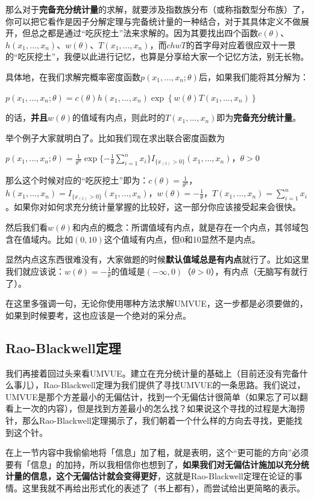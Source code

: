 \documentclass[10pt, a4paper]{article}
\begin{document}
那么对于\textbf{完备充分统计量}的求解，就要涉及指数族分布（或称指数型分布族）了，你可以把它看作是因子分解定理与完备统计量的一种结合，对于其具体定义不做展开，但总之都是通过“吃灰挖土”法来求解的。因为其要找出四个函数$c(\theta)$、$h(x_1,\dots,x_n)$、$w(\theta)$、$T(x_1,\dots,x_n)$，而$chwT$的首字母对应着很应双十一景的“吃灰挖土”，我便以此进行记忆，也算是分享给大家一个记忆方法，别无长物。\par
具体地，在我们求解完概率密度函数$p(x_1,\dots,x_n;\theta)$后，如果我们能将其分解为：
\begin{center}
   $p(x_1,\dots,x_n;\theta)=c(\theta)h(x_1,\dots,x_n)\exp\left\{w(\theta)T(x_1,\dots,x_n)\right\}$ 
\end{center}
的话，\textbf{并且}$w(\theta)$的值域有内点，则此时的$T(x_1,\dots,x_n)$即为\textbf{完备充分统计量}。\par
举个例子大家就明白了。比如我们现在求出联合密度函数为
\begin{center}
    $p(x_1,\dots,x_n;\theta)=\frac{1}{\theta ^n} \exp\{-\frac{1}{\theta} \sum_{i=1}^{n} x_i\} I_{\{x_{(1)} > 0\}} (x_1,\dots,x_n)$，$\theta>0$
 \end{center}

那么这个时候对应的“吃灰挖土”即为：$c(\theta)=\frac{1}{\theta ^n}$，$h(x_1,\dots,x_n)=I_{\{x_{(1)} > 0\}} (x_1,\dots,x_n)$，$w(\theta)=-\frac{1}{\theta}$，$T(x_1,\dots,x_n)=\sum_{i=1}^{n} x_i$。如果你对如何求充分统计量掌握的比较好，这一部分你应该接受起来会很快。\par

然后我们看$w(\theta)$和内点的概念：所谓值域有内点，就是存在一个内点，其邻域包含在值域内。比如$(0,10)$这个值域有内点，但0和10显然不是内点。\par

显然内点这东西很难没有，大家做题的时候\textbf{默认值域总是有内点}就行了。比如这里我们就应该说：$w(\theta)=-\frac{1}{\theta}$的值域是$(-\infty,0)$（$\theta>0$），有内点（无脑写有就行了）。

在这里多强调一句，无论你使用哪种方法求解UMVUE，这一步都是必须要做的，如果到时候要考，这也应该是一个绝对的采分点。

\subsection{Rao-Blackwell定理}
我们再接着回过头来看UMVUE。建立在充分统计量的基础上（目前还没有完备什么事儿），Rao-Blackwell定理为我们提供了寻找UMVUE的一条思路。我们说过，UMVUE是那个方差最小的无偏估计，找到一个无偏估计很简单（如果忘了可以翻看上一次的内容），但是找到方差最小的怎么找？如果说这个寻找的过程是大海捞针，那么Rao-Blackwell定理揭示了，我们朝着一个什么样的方向去寻找，更能找到这个针。\par
在上一节内容中我偷偷地将「信息」加了粗，就是表明，这个“更可能的方向”必须要有「信息」的加持，所以我相信你也想到了，\textbf{如果我们对无偏估计施加以充分统计量的信息，这个无偏估计就会变得更好}，这就是Rao-Blackwell定理在论证的事情。这里我就不再给出形式化的表述了（书上都有），而尝试给出更简略的表示。\par
\end{document}
